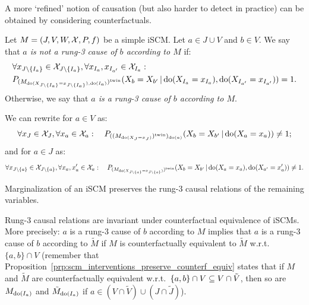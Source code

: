 A more `refined' notion of causation (but also harder to detect in practice) can be obtained by considering counterfactuals.
\begin{Def}\label{def:scm_rung3_cause_of}
  Let $M = \left ( J, V, W, \mathcal{X}, P, f \right )$ be a simple iSCM.
  Let $a \in J \cup V$ and $b \in V$.
  We say that \emph{$a$ is not a rung-3 cause of $b$ according to $M$} if:
    \begin{equation}\label{eq:scm_rung3_cause_of}\begin{split}
      & \forall x_{J\setminus\{I_a\}} \in \mathcal{X}_{J\setminus\{I_a\}}, \forall x_{I_a},x_{I_{a'}} \in \mathcal{X}_{I_a}: \\
      & P_{(M_{\operatorname{do}(X_{J\setminus\{I_a\}}=x_{J\setminus\{I_a\}}),\operatorname{do}(I_a)})^{\mathrm{twin}}}(X_b = X_{b'} \operatorname*{|} \operatorname{do}(X_{I_a}=x_{I_a}),\operatorname{do}(X_{I_{a'}}=x_{I_{a'}})) = 1.
    \end{split}\end{equation}
  Otherwise, we say that \emph{$a$ is a rung-3 cause of $b$ according to $M$}.
\end{Def}
\begin{Rem}\label{rem:scm_rung3_cause_of}
  We can rewrite  for $a \in V$ as:
    $$\forall x_J \in \mathcal{X}_J, \forall x_a \in \mathcal{X}_a: \quad P_{((M_{\operatorname{do}(X_J=x_J)})^{\mathrm{twin}})_{\operatorname{do}(a)}}(X_b = X_{b'} \operatorname*{|} \operatorname{do}(X_a=x_a)) \ne 1;$$
  and for $a \in J$ as:
    $$\forall x_{J\setminus\{a\}} \in \mathcal{X}_{J\setminus\{a\}}, \forall x_a,x_a' \in \mathcal{X}_a: \quad P_{(M_{\operatorname{do}(X_{J\setminus\{a\}}=x_{J\setminus\{a\}})})^{\mathrm{twin}}}(X_b = X_{b'} \operatorname*{|} \operatorname{do}(X_a=x_a),\operatorname{do}(X_{a'}=x_a')) \ne 1.$$
\end{Rem}
\begin{Rem}\label{rem:scm_rung3_cause_of_marginalization}
  Marginalization of an iSCM preserves the rung-3 causal relations of the remaining variables.
\end{Rem}
\begin{Rem}\label{rem:scm_rung3_cause_of_counterfactual_equivalence}
  Rung-3 causal relations are invariant under counterfactual equivalence of iSCMs.
  More precisely: $a$ is a rung-3 cause of $b$ according to $M$ implies that $a$ is a rung-3 cause of $b$ according to $\tilde{M}$ if $M$ is counterfactually equivalent to $\tilde{M}$ w.r.t.\ $\{a,b\} \cap V$
  (remember that Proposition~\ref{prp:scm_interventions_preserve_counterf_equiv} states that if $M$ and $\tilde{M}$ are counterfactually equivalent w.r.t.\ $\{a,b\} \cap V \subseteq V \cap \tilde{V}$, then so are $M_{\operatorname{do}(I_a)}$ and $\tilde{M}_{\operatorname{do}(I_a)}$ if $a \in (V \cap \tilde{V}) \cup (J \cap \tilde{J})$).
\end{Rem}

